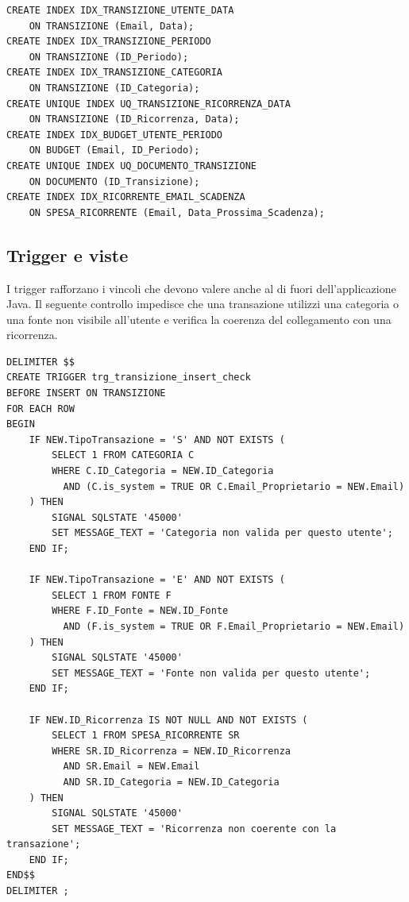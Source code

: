 \documentclass[11pt,a4paper]{article}
\begin{document}
\begin{lstlisting}[caption={Indici principali dello schema}]
CREATE INDEX IDX_TRANSIZIONE_UTENTE_DATA
    ON TRANSIZIONE (Email, Data);
CREATE INDEX IDX_TRANSIZIONE_PERIODO
    ON TRANSIZIONE (ID_Periodo);
CREATE INDEX IDX_TRANSIZIONE_CATEGORIA
    ON TRANSIZIONE (ID_Categoria);
CREATE UNIQUE INDEX UQ_TRANSIZIONE_RICORRENZA_DATA
    ON TRANSIZIONE (ID_Ricorrenza, Data);
CREATE INDEX IDX_BUDGET_UTENTE_PERIODO
    ON BUDGET (Email, ID_Periodo);
CREATE UNIQUE INDEX UQ_DOCUMENTO_TRANSIZIONE
    ON DOCUMENTO (ID_Transizione);
CREATE INDEX IDX_RICORRENTE_EMAIL_SCADENZA
    ON SPESA_RICORRENTE (Email, Data_Prossima_Scadenza);
\end{lstlisting}

\subsection{Trigger e viste}
I trigger rafforzano i vincoli che devono valere anche al di fuori dell'applicazione Java. Il seguente controllo impedisce che una transazione utilizzi una categoria o una fonte non visibile all'utente e verifica la coerenza del collegamento con una ricorrenza.

\begin{lstlisting}[caption={Trigger di controllo sull'inserimento di una transazione}]
DELIMITER $$
CREATE TRIGGER trg_transizione_insert_check
BEFORE INSERT ON TRANSIZIONE
FOR EACH ROW
BEGIN
    IF NEW.TipoTransazione = 'S' AND NOT EXISTS (
        SELECT 1 FROM CATEGORIA C
        WHERE C.ID_Categoria = NEW.ID_Categoria
          AND (C.is_system = TRUE OR C.Email_Proprietario = NEW.Email)
    ) THEN
        SIGNAL SQLSTATE '45000'
        SET MESSAGE_TEXT = 'Categoria non valida per questo utente';
    END IF;

    IF NEW.TipoTransazione = 'E' AND NOT EXISTS (
        SELECT 1 FROM FONTE F
        WHERE F.ID_Fonte = NEW.ID_Fonte
          AND (F.is_system = TRUE OR F.Email_Proprietario = NEW.Email)
    ) THEN
        SIGNAL SQLSTATE '45000'
        SET MESSAGE_TEXT = 'Fonte non valida per questo utente';
    END IF;

    IF NEW.ID_Ricorrenza IS NOT NULL AND NOT EXISTS (
        SELECT 1 FROM SPESA_RICORRENTE SR
        WHERE SR.ID_Ricorrenza = NEW.ID_Ricorrenza
          AND SR.Email = NEW.Email
          AND SR.ID_Categoria = NEW.ID_Categoria
    ) THEN
        SIGNAL SQLSTATE '45000'
        SET MESSAGE_TEXT = 'Ricorrenza non coerente con la transazione';
    END IF;
END$$
DELIMITER ;
\end{lstlisting}
\end{document}
